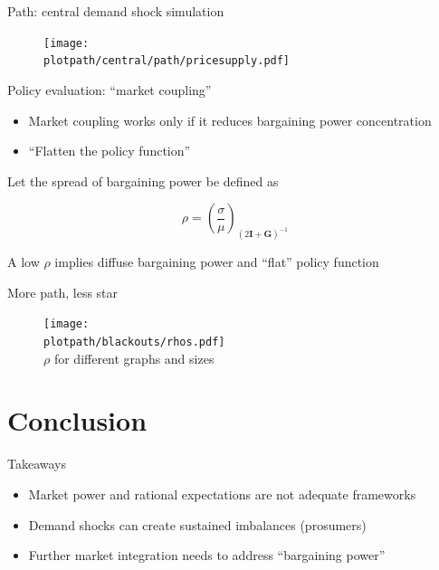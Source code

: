 \documentclass{beamer}
\newcommand{\matr}[1]{\bm{#1}}
\newcommand{\I}{\matr{I}}
\newcommand{\G}{\matr{G}}
\newcommand{\plotpath}{../../plots}
\begin{document}
\begin{frame} {Path: central demand shock simulation}
    \begin{figure}[H]
        \centering
        \texttt{[image: \\plotpath/central/path/pricesupply.pdf]}
    \end{figure}
\end{frame}

\begin{frame}{Policy evaluation: ``market coupling''}
    \begin{itemize}
        \item Market coupling works only if it reduces bargaining power concentration \pause
        \item ``Flatten the policy function'' \pause
    \end{itemize}

    Let the spread of bargaining power be defined as

    \begin{equation*}
        \rho = \left(\frac{\sigma}{\mu}\right)_{(2\I + \G)^{-1}}
    \end{equation*}

    A low $\rho$ implies diffuse bargaining power and ``flat'' policy function
\end{frame}

\begin{frame}[allowframebreaks]{More path, less star}

    \centering
    \resizebox{0.7\textwidth}{!}{}



    \begin{figure}
        \texttt{[image: \\plotpath/blackouts/rhos.pdf]}
        \\ $\rho$ for different graphs and sizes
    \end{figure}

\end{frame}

\section{Conclusion}

\begin{frame}{Takeaways}
    \begin{itemize} \setlength\itemsep{1.5em}
        \item Market power and rational expectations are not adequate frameworks \pause
        \item Demand shocks can create sustained imbalances (prosumers) \pause
        \item Further market integration needs to address ``bargaining power''
    \end{itemize}
\end{frame}
\end{document}
